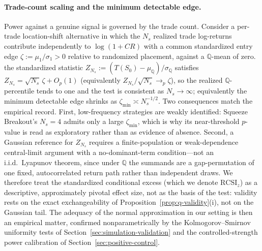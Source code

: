\documentclass[preprint,12pt]{elsarticle}
\theoremstyle{definition}
\begin{document}
\paragraph{Trade-count scaling and the minimum detectable edge.} Power against a genuine signal is governed by the trade count. Consider a per-trade location-shift alternative in which the $N_s$ realized trade log-returns contribute independently to $\log(1+CR)$ with a common standardized entry edge $\zeta:=\mu_1/\sigma_1>0$ relative to randomized placement, against a $\mathbb{Q}$-mean of zero. the standardized statistic $Z_{N_s}:=(T(S_0)-\mu_{\mathbb Q})/\sigma_{\mathbb Q}$ satisfies $Z_{N_s}=\sqrt{N_s}\,\zeta+O_p(1)$ (equivalently $Z_{N_s}/\sqrt{N_s}\to_p\zeta$), so the realized $\mathbb{Q}$-percentile tends to one and the test is consistent as $N_s\to\infty$; equivalently the minimum detectable edge shrinks as $\zeta_{\min}\asymp N_s^{-1/2}$. Two consequences match the empirical record. First, low-frequency strategies are weakly identified: Squeeze Breakout's $N_s=4$ admits only a large $\zeta_{\min}$, which is why its near-threshold $p$-value is read as exploratory rather than as evidence of absence. Second, a Gaussian reference for $Z_{N_s}$ requires a finite-population or weak-dependence central-limit argument with a no-dominant-term condition---not an i.i.d.\ Lyapunov theorem, since under $\mathbb{Q}$ the summands are a gap-permutation of one fixed, autocorrelated return path rather than independent draws. We therefore treat the standardized conditional excess (which we denote $\mathrm{RCSI}_z$) as a descriptive, approximately pivotal effect size, not as the basis of the test: validity rests on the exact exchangeability of Proposition~\ref{prop:q-validity}(i), not on the Gaussian tail. The adequacy of the normal approximation in our setting is then an empirical matter, confirmed nonparametrically by the Kolmogorov--Smirnov uniformity tests of Section~\ref{sec:simulation-validation} and the controlled-strength power calibration of Section~\ref{sec:positive-control}.
\end{document}
